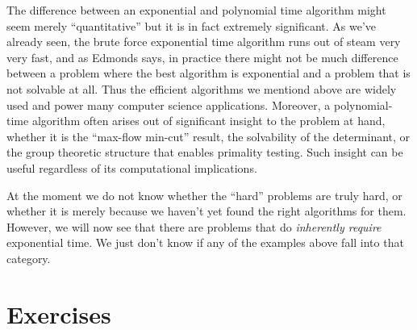 The difference between an exponential and polynomial time algorithm
might seem merely ``quantitative'' but it is in fact extremely
significant. As we've already seen, the brute force exponential time
algorithm runs out of steam very very fast, and as Edmonds says, in
practice there might not be much difference between a problem where the
best algorithm is exponential and a problem that is not solvable at all.
Thus the efficient algorithms we mentiond above are widely used and
power many computer science applications. Moreover, a polynomial-time
algorithm often arises out of significant insight to the problem at
hand, whether it is the ``max-flow min-cut'' result, the solvability of
the determinant, or the group theoretic structure that enables primality
testing. Such insight can be useful regardless of its computational
implications.

At the moment we do not know whether the ``hard'' problems are truly
hard, or whether it is merely because we haven't yet found the right
algorithms for them. However, we will now see that there are problems
that do \emph{inherently require} exponential time. We just don't know
if any of the examples above fall into that category.


\section{Exercises}\label{Exercises}

